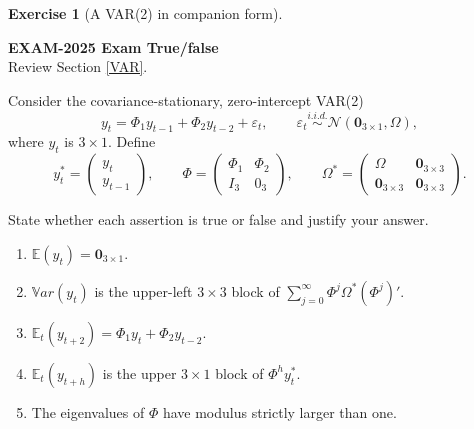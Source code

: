 \documentclass[
  11pt,
]{book}
\providecommand{\tightlist}{%
  \setlength{\itemsep}{0pt}\setlength{\parskip}{0pt}}
\theoremstyle{definition}
\theoremstyle{definition}
\theoremstyle{definition}
\newtheorem{exercise}{Exercise}[chapter]
\theoremstyle{definition}
\theoremstyle{remark}
\begin{document}
\begin{exercisebox}

\begin{exercise}[A VAR(2) in companion form]
\protect\hypertarget{exr:ex-exam2025-var2-companion-form}{}\label{exr:ex-exam2025-var2-companion-form}

\textbf{EXAM-2025 \textbar{} Exam \textbar{} True/false}\\
Review Section \ref{VAR}.

Consider the covariance-stationary, zero-intercept VAR(2)
\[
y_t=\Phi_1y_{t-1}+\Phi_2y_{t-2}+\varepsilon_t,
\qquad
\varepsilon_t\overset{i.i.d.}{\sim}\mathcal N(\mathbf 0_{3\times1},\Omega),
\]
where \(y_t\) is \(3\times1\). Define
\[
y_t^*=\begin{pmatrix}y_t\\y_{t-1}\end{pmatrix},
\qquad
\Phi=\begin{pmatrix}\Phi_1&\Phi_2\\I_3&0_3\end{pmatrix},
\qquad
\Omega^*=\begin{pmatrix}\Omega&\mathbf 0_{3\times3}\\\mathbf 0_{3\times3}&\mathbf 0_{3\times3}\end{pmatrix}.
\]

State whether each assertion is true or false and justify your answer.

\begin{enumerate}
\def\labelenumi{\arabic{enumi}.}
\tightlist
\item
  \(\mathbb E(y_t)=\mathbf 0_{3\times1}\).
\item
  \(\mathbb{V}ar(y_t)\) is the upper-left \(3\times3\) block of \(\sum_{j=0}^{\infty}\Phi^j\Omega^*(\Phi^j)'\).
\item
  \(\mathbb E_t(y_{t+2})=\Phi_1y_t+\Phi_2y_{t-2}\).
\item
  \(\mathbb E_t(y_{t+h})\) is the upper \(3\times1\) block of \(\Phi^hy_t^*\).
\item
  The eigenvalues of \(\Phi\) have modulus strictly larger than one.
\end{enumerate}

\end{exercise}

\end{exercisebox}

\end{document}

